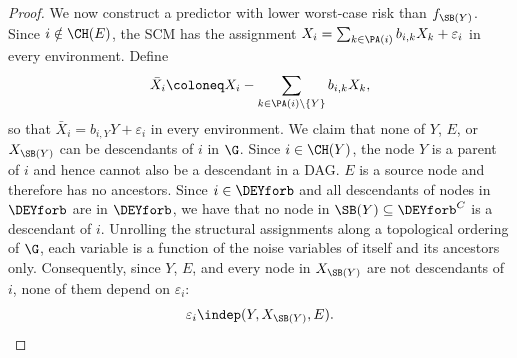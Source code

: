 \begin{proof}


We now construct a predictor with lower worst-case risk than $f_{\SB(Y)}$.
Since $i\notin\CH(E)$, the SCM has the assignment
$X_i=\sum_{k\in\PA(i)} b_{i,k} X_k+\varepsilon_i$ in every environment. Define
\[
\bar{X}_i\coloneq X_i - \sum_{k\in\PA(i)\setminus\{Y\}} b_{i,k}  X_k,
\]
so that $\bar{X}_i=b_{i,Y}  Y+\varepsilon_i$ in every environment.
We claim that none of $Y$, $E$, or $X_{\SB(Y)}$ can be descendants of $i$ in $\G$.
Since $i\in\CH(Y)$, the node $Y$ is a parent of $i$ and hence cannot
also be a descendant in a DAG.
$E$ is a source node and therefore has no ancestors.
Since $i\in\DEYforb$ and all descendants of nodes in $\DEYforb$ are in $\DEYforb$, we have that no node in $\SB(Y)\subseteq\DEYforb^C$ is a descendant of $i$. Unrolling the structural assignments along a topological ordering
of $\G$, each variable is a function of the noise variables of itself
and its ancestors only. Consequently, since $Y$, $E$, and every node in
$X_{\SB(Y)}$ are not descendants of $i$, none of them depend
on $\varepsilon_i$:
\begin{equation}\label{eq:eps_indep}
\varepsilon_i\indep(Y,  X_{\SB(Y)},  E).
\end{equation}


\end{proof}

